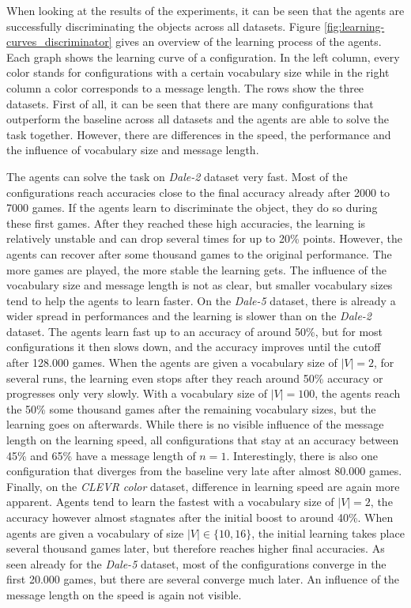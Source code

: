 When looking at the results of the experiments, it can be seen that the agents are successfully discriminating the objects across all datasets.
Figure \ref{fig:learning-curves_discriminator} gives an overview of the learning process of the agents.
Each graph shows the learning curve of a configuration.
In the left column, every color stands for configurations with a certain vocabulary size while in the right column a color corresponds to a message length.
The rows show the three datasets.
First of all, it can be seen that there are many configurations that outperform the baseline across all datasets and the agents are able to solve the task together.
However, there are differences in the speed, the performance and the influence of vocabulary size and message length.

The agents can solve the task on \emph{Dale-2} dataset very fast.
Most of the configurations reach accuracies close to the final accuracy already after 2000 to 7000 games.
If the agents learn to discriminate the object, they do so during these first games.
After they reached these high accuracies, the learning is relatively unstable and can drop several times for up to 20\% points.
However, the agents can recover after some thousand games to the original performance.
The more games are played, the more stable the learning gets.
The influence of the vocabulary size and message length is not as clear, but smaller vocabulary sizes tend to help the agents to learn faster.
On the \emph{Dale-5} dataset, there is already a wider spread in performances and the learning is slower than on the \emph{Dale-2} dataset.
The agents learn fast up to an accuracy of around 50\%, but for most configurations it then slows down, and the accuracy improves until the cutoff after 128.000 games.
When the agents are given a vocabulary size of $|V|=2$, for several runs, the learning even stops after they reach around 50\% accuracy or progresses only very slowly.
With a vocabulary size of $|V|=100$, the agents reach the 50\% some thousand games after the remaining vocabulary sizes, but the learning goes on afterwards.
While there is no visible influence of the message length on the learning speed, all configurations that stay at an accuracy between 45\% and 65\% have a message length of $n=1$.
Interestingly, there is also one configuration that diverges from the baseline very late after almost 80.000 games.
Finally, on the \emph{CLEVR color} dataset, difference in learning speed are again more apparent.
Agents tend to learn the fastest with a vocabulary size of $|V|=2$, the accuracy however almost stagnates after the initial boost to around 40\%.
When agents are given a vocabulary of size $|V| \in \{10,16\}$, the initial learning takes place several thousand games later, but therefore reaches higher final accuracies.
As seen already for the \emph{Dale-5} dataset, most of the configurations converge in the first 20.000 games, but there are several converge much later.
An influence of the message length on the speed is again not visible.

